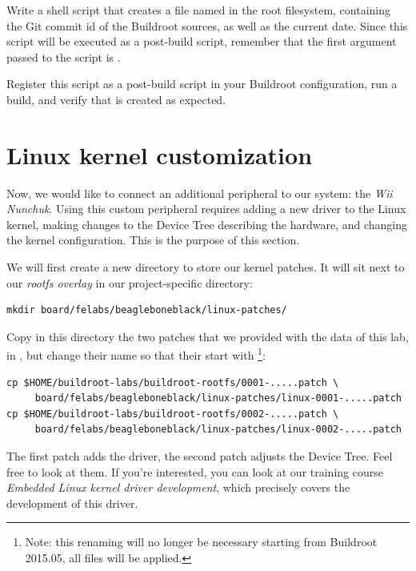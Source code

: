 Write a shell script that creates a file named  in
the root filesystem, containing the Git commit id of the Buildroot
sources, as well as the current date. Since this script will be
executed as a post-build script, remember that the first argument
passed to the script is .

Register this script as a post-build script in your Buildroot
configuration, run a build, and verify that  is
created as expected.

\section{Linux kernel customization}

Now, we would like to connect an additional peripheral to our system:
the {\em Wii Nunchuk}. Using this custom peripheral requires adding a
new driver to the Linux kernel, making changes to the Device Tree
describing the hardware, and changing the kernel configuration. This
is the purpose of this section.

We will first create a new directory to store our kernel patches. It
will sit next to our {\em rootfs overlay} in our project-specific
directory:

\begin{verbatim}
mkdir board/felabs/beagleboneblack/linux-patches/
\end{verbatim}

Copy in this directory the two patches that we provided with the data
of this lab, in , but change
their name so that their start with \footnote{Note: this
  renaming will no longer be necessary starting from Buildroot
  2015.05, all  files will be applied.}:

\begin{verbatim}
cp $HOME/buildroot-labs/buildroot-rootfs/0001-.....patch \
     board/felabs/beagleboneblack/linux-patches/linux-0001-.....patch
cp $HOME/buildroot-labs/buildroot-rootfs/0002-.....patch \
     board/felabs/beagleboneblack/linux-patches/linux-0002-.....patch
\end{verbatim}

The first patch adds the driver, the second patch adjusts the Device
Tree. Feel free to look at them. If you're interested, you can look at
our training course {\em Embedded Linux kernel driver development},
which precisely covers the development of this driver.

